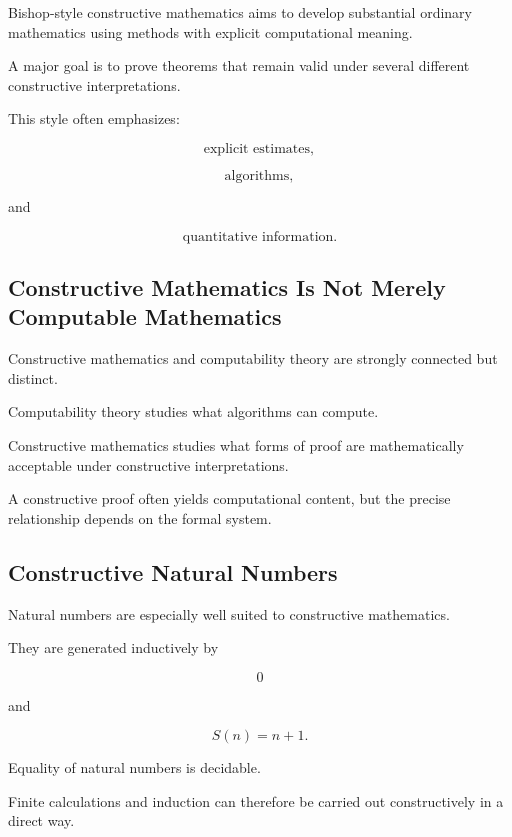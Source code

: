 Bishop-style constructive mathematics aims to develop substantial ordinary
mathematics using methods with explicit computational meaning.

A major goal is to prove theorems that remain valid under several different
constructive interpretations.

This style often emphasizes:

\[
\boxed{
\text{explicit estimates},
}
\]

\[
\boxed{
\text{algorithms},
}
\]

and

\[
\boxed{
\text{quantitative information}.
}
\]

\subsection{Constructive Mathematics Is Not Merely Computable Mathematics}
\label{subsec:constructive-vs-computable}

Constructive mathematics and computability theory are strongly connected
but distinct.

Computability theory studies what algorithms can compute.

Constructive mathematics studies what forms of proof are mathematically
acceptable under constructive interpretations.

A constructive proof often yields computational content, but the precise
relationship depends on the formal system.

\subsection{Constructive Natural Numbers}
\label{subsec:constructive-natural-numbers}

Natural numbers are especially well suited to constructive mathematics.

They are generated inductively by

\[
\boxed{
0
}
\]

and

\[
\boxed{
S(n)=n+1.
}
\]

Equality of natural numbers is decidable.

Finite calculations and induction can therefore be carried out
constructively in a direct way.

